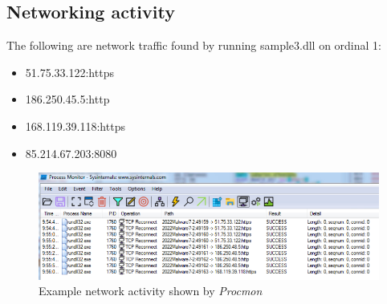 \documentclass{article}
\begin{document}
    \subsection{Networking activity}
    The following are network traffic found by running sample3.dll on ordinal 1:
    \begin{itemize}
        \item 51.75.33.122:https
        \item 186.250.45.5:http
        \item 168.119.39.118:https
        \item 85.214.67.203:8080
    \end{itemize}
    \begin{figure}[H]
        \includegraphics[width=\textwidth]{networkProcmon.png}
        \caption{Example network activity shown by \textit{Procmon}}
    \end{figure}
\end{document}

